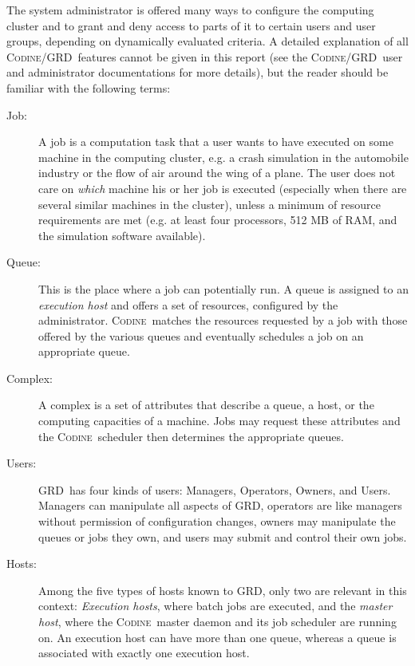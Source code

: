 \documentclass[a4paper, titlepage, twoside]{article}
\newcommand{\codine}{\textsc{Codine}}
\newcommand{\GRD}{\textsc{GRD}}
\begin{document}
The system administrator is offered many ways to configure the computing
cluster and to grant and deny access to parts of it to certain users and
user groups, depending on dynamically evaluated criteria. A detailed
explanation of all \codine/\GRD\ features cannot be given in this report (see
the \codine/\GRD\ user and administrator documentations
\cite{b_codine, b_grd} for more details), but
the reader should be familiar with the following terms:

\begin{description}
\item[Job:] A job is a computation task that a user wants to have executed on 
some machine in the computing cluster, e.g. a crash simulation in the automobile
industry or the flow of air around the wing of a plane. The user does not
care on \emph{which} machine his or her job is executed (especially when
there are several similar machines in the cluster), unless a minimum of
resource requirements are met (e.g. at least four processors, 512 MB of
RAM, and the simulation software available).

\item[Queue:] This is the place where a job can potentially run. A queue is
assigned to an \textsl{execution host} and offers a set of resources,
configured by the administrator. \codine\
matches the resources requested by a job with those offered by the
various queues and eventually schedules a job on an appropriate queue.

\item[Complex:] A complex is a set of attributes that describe a queue, a
host, or the computing capacities of a machine. Jobs may request these
attributes and the \codine\ scheduler then determines the appropriate queues.

\item[Users:] \GRD\ has four kinds of users: Managers, Operators, Owners, and
Users. Managers can manipulate all aspects of \GRD, operators are like managers
without permission of configuration changes,
owners may manipulate the queues or jobs they own, and users may 
submit and control their own jobs.

\item[Hosts:] Among the five types of hosts known to \GRD, only two are
relevant in this context: \textsl{Execution hosts}, where batch jobs are
executed, and the \textsl{master host}, where the \codine\ master daemon and
its job scheduler are
running on. An execution host can have more than one queue, whereas a queue
is associated with exactly one execution host.

\end{description}
\end{document}
